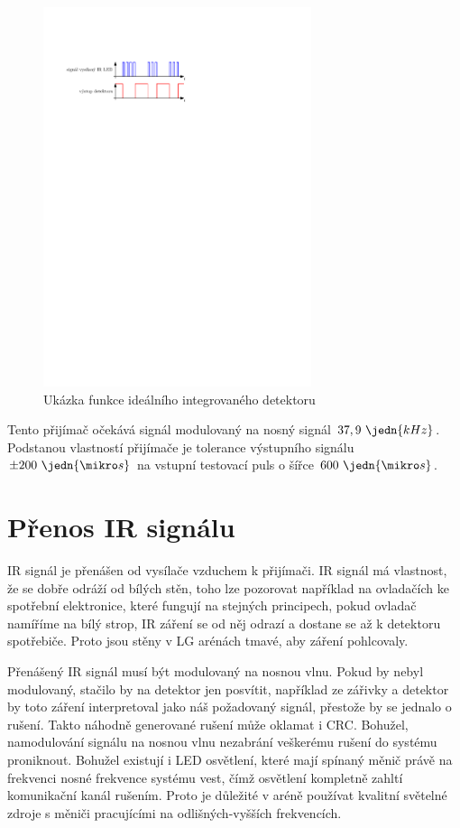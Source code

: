 \begin{figure}[H]
    \begin{center}
        \includegraphics[width=0.7\textwidth]{img/funkce-ir-detektoru}
    \end{center}
    \caption{Ukázka funkce ideálního integrovaného detektoru}
\end{figure}

Tento přijímač očekává signál modulovaný na nosný signál $37,9~\jedn{kHz}$. Podstanou vlastností přijímače je tolerance výstupního signálu $\pm 200~\jedn{\mikro s}$ na vstupní testovací puls o šířce $600~\jedn{\mikro s}$.

\section{Přenos IR signálu}
IR signál je přenášen od vysílače vzduchem k přijímači. IR signál má vlastnost, že se dobře odráží od bílých stěn, toho lze pozorovat například na ovladačích ke spotřební elektronice, které fungují na stejných principech, pokud ovladač namíříme na bílý strop, IR záření se od něj odrazí a dostane se až k detektoru spotřebiče. Proto jsou stěny v LG arénách tmavé, aby záření pohlcovaly.

Přenášený IR signál musí být modulovaný na nosnou vlnu. Pokud by nebyl modulovaný, stačilo by na detektor jen posvítit, například ze zářivky a detektor by toto záření interpretoval jako náš požadovaný signál, přestože by se jednalo o rušení. Takto náhodně generované rušení může oklamat i CRC. Bohužel, namodulování signálu na nosnou vlnu nezabrání veškerému rušení do systému proniknout. Bohužel existují i LED osvětlení, které mají spínaný měnič právě na frekvenci nosné frekvence systému vest, čímž osvětlení kompletně zahltí komunikační kanál rušením. Proto je důležité v aréně používat kvalitní světelné zdroje s měniči pracujícími na odlišných-vyšších frekvencích.

